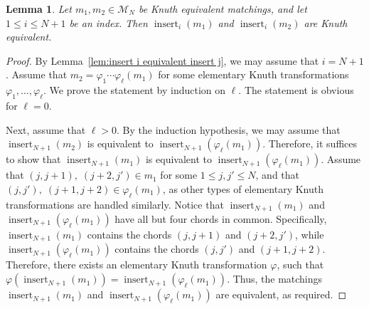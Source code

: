 \documentclass[11pt]{article}
\newtheorem{lemma}[theo]{Lemma}
\theoremstyle{definition}
\numberwithin{equation}{section}
\newcommand{\insrt}{\operatorname{insert}}
\newcommand{\M}{\mathcal{M}}
\begin{document}
\begin{lemma}
\label{lem:insert same chord to equivalent remains equivalent}
    Let $m_1,m_2 \in \M_N$ be Knuth equivalent matchings, and let $1 \le i \le N+1$ be an index. Then $\insrt_i(m_1)$ and $\insrt_i(m_2)$ are Knuth equivalent.
\end{lemma}

\begin{proof}
    By Lemma~\ref{lem:insert i equivalent insert j}, we may assume that $i = N+1$. Assume that $m_2 = \varphi_1 \cdots \varphi_\ell (m_1)$ for some elementary Knuth transformations $\varphi_1, \dots, \varphi_\ell$. We prove the statement by induction on $\ell$. The statement is obvious for $\ell = 0$.

    Next, assume that $\ell > 0$. By the induction hypothesis, we may assume that $\insrt_{N+1}(m_2)$ is equivalent to $\insrt_{N+1}(\varphi_\ell(m_1))$. Therefore, it suffices to show that $\insrt_{N+1}(m_1)$ is equivalent to $\insrt_{N+1}(\varphi_\ell(m_1))$. Assume that $(j,j+1),\; (j+2,j') \in m_1$ for some $1 \le j,j' \le N$, and that $(j,j'),\; (j+1,j+2) \in \varphi_\ell(m_1)$, as other types of elementary Knuth transformations are handled similarly. Notice that $\insrt_{N+1}(m_1)$ and $\insrt_{N+1}(\varphi_\ell(m_1))$ have all but four chords in common. Specifically, $\insrt_{N+1}(m_1)$ contains the chords $(j,j+1)$ and $(j+2,j')$, while $\insrt_{N+1}(\varphi_\ell(m_1))$ contains the chords $(j,j')$ and $(j+1,j+2)$. Therefore, there exists an elementary Knuth transformation $\varphi$, such that $\varphi(\insrt_{N+1}(m_1)) = \insrt_{N+1}(\varphi_\ell(m_1))$. Thus, the matchings $\insrt_{N+1}(m_1)$ and $\insrt_{N+1}(\varphi_\ell(m_1))$ are equivalent, as required.
\end{proof}
\end{document}
